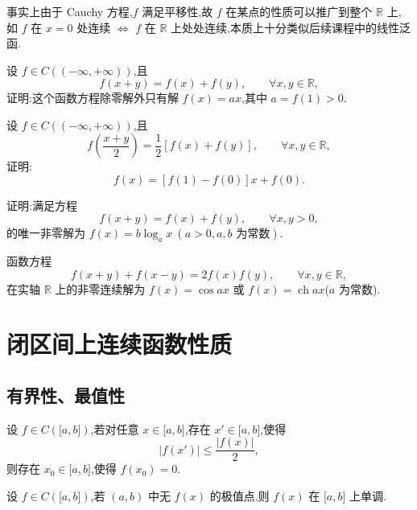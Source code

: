 \documentclass[../数学分析培优讲义.tex]{subfiles}
\begin{document}
\begin{remark}
事实上由于 Cauchy 方程,$f$ 满足平移性,故 $f$ 在某点的性质可以推广到整个 $\mathbb{R}$ 上,如 $f$ 在 $x=0$ 处连续 $\Longleftrightarrow$ $f$ 在 $\mathbb{R}$ 上处处连续,本质上十分类似后续课程中的线性泛函.
\end{remark}

\begin{example}
设 $f\in C(( -\infty,+\infty))$,且
\[
    f(x+y)=f(x)+f(y),
    \qquad \forall x,y\in\mathbb{R},
\]
证明:这个函数方程除零解外只有解 $f(x)=ax$,其中 $a=f(1)>0$.
\end{example}
\exampleblank

\begin{example}
设 $f\in C(( -\infty,+\infty))$,且
\[
    f\left(\dfrac{x+y}{2}\right)=\dfrac{1}{2}[f(x)+f(y)],
    \qquad \forall x,y\in\mathbb{R},
\]
证明:
\[
    f(x)=[f(1)-f(0)]x+f(0).
\]
\end{example}
\exampleblank

\begin{example}
证明:满足方程
\[
    f(x+y)=f(x)+f(y),
    \qquad \forall x,y>0,
\]
的唯一非零解为 $f(x)=b\log_a x\ (a>0,a,b\text{ 为常数})$.
\end{example}
\exampleblank

\begin{example}
函数方程
\[
    f(x+y)+f(x-y)=2f(x)f(y),
    \qquad \forall x,y\in\mathbb{R},
\]
在实轴 $\mathbb{R}$ 上的非零连续解为 $f(x)=\cos ax$ 或 $f(x)=\operatorname{ch}ax$($a$ 为常数).
\end{example}
\exampleblank


\newpage

\section{闭区间上连续函数性质}


\subsection{有界性、最值性}

\begin{example}
设 $f\in C(\lbrack a,b\rbrack)$,若对任意 $x\in\lbrack a,b\rbrack$,存在 $x'\in\lbrack a,b\rbrack$,使得
\[
    |f(x')|\leq\dfrac{|f(x)|}{2},
\]
则存在 $x_0\in\lbrack a,b\rbrack$,使得 $f(x_0)=0$.
\end{example}
\exampleblank

\begin{example}
设 $f\in C(\lbrack a,b\rbrack)$,若 $(a,b)$ 中无 $f(x)$ 的极值点,则 $f(x)$ 在 $\lbrack a,b\rbrack$ 上单调.
\end{example}
\exampleblank
\end{document}
